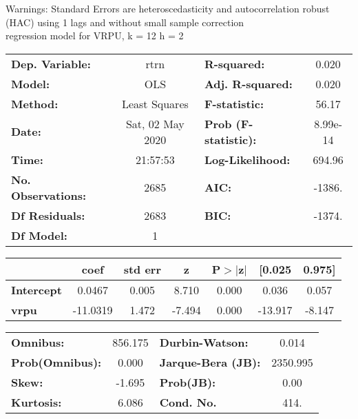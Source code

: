 Warnings: \newline
 [1] Standard Errors are heteroscedasticity and autocorrelation robust (HAC) using 1 lags and without small sample correction\\ 

regression model for VRPU, k = 12 h = 2\begin{center}
\begin{tabular}{lclc}
\toprule
\textbf{Dep. Variable:}    &       rtrn       & \textbf{  R-squared:         } &     0.020   \\
\textbf{Model:}            &       OLS        & \textbf{  Adj. R-squared:    } &     0.020   \\
\textbf{Method:}           &  Least Squares   & \textbf{  F-statistic:       } &     56.17   \\
\textbf{Date:}             & Sat, 02 May 2020 & \textbf{  Prob (F-statistic):} &  8.99e-14   \\
\textbf{Time:}             &     21:57:53     & \textbf{  Log-Likelihood:    } &    694.96   \\
\textbf{No. Observations:} &        2685      & \textbf{  AIC:               } &    -1386.   \\
\textbf{Df Residuals:}     &        2683      & \textbf{  BIC:               } &    -1374.   \\
\textbf{Df Model:}         &           1      & \textbf{                     } &             \\
\bottomrule
\end{tabular}
\begin{tabular}{lcccccc}
                   & \textbf{coef} & \textbf{std err} & \textbf{z} & \textbf{P$> |$z$|$} & \textbf{[0.025} & \textbf{0.975]}  \\
\midrule
\textbf{Intercept} &       0.0467  &        0.005     &     8.710  &         0.000        &        0.036    &        0.057     \\
\textbf{vrpu}      &     -11.0319  &        1.472     &    -7.494  &         0.000        &      -13.917    &       -8.147     \\
\bottomrule
\end{tabular}
\begin{tabular}{lclc}
\textbf{Omnibus:}       & 856.175 & \textbf{  Durbin-Watson:     } &    0.014  \\
\textbf{Prob(Omnibus):} &   0.000 & \textbf{  Jarque-Bera (JB):  } & 2350.995  \\
\textbf{Skew:}          &  -1.695 & \textbf{  Prob(JB):          } &     0.00  \\
\textbf{Kurtosis:}      &   6.086 & \textbf{  Cond. No.          } &     414.  \\
\bottomrule
\end{tabular}
\end{center}

